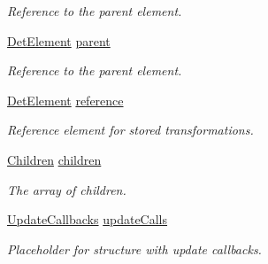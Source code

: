 \begin{DoxyCompactItemize}
\begin{DoxyCompactList}\small\item\em Reference to the parent element. \end{DoxyCompactList}\item 
\hyperlink{class_d_d4hep_1_1_geometry_1_1_det_element}{Det\+Element} \hyperlink{class_d_d4hep_1_1_geometry_1_1_det_element_object_a70ce8bf0603c0a7a4f6331faf71e66b6}{parent}
\begin{DoxyCompactList}\small\item\em Reference to the parent element. \end{DoxyCompactList}\item 
\hyperlink{class_d_d4hep_1_1_geometry_1_1_det_element}{Det\+Element} \hyperlink{class_d_d4hep_1_1_geometry_1_1_det_element_object_a6b87ce69ec6c292e36e87f5fed651278}{reference}
\begin{DoxyCompactList}\small\item\em Reference element for stored transformations. \end{DoxyCompactList}\item 
\hyperlink{class_d_d4hep_1_1_geometry_1_1_det_element_object_aaf04a1f51d7a7ce4c0e0dc4863268d8a}{Children} \hyperlink{class_d_d4hep_1_1_geometry_1_1_det_element_object_add8a182c8a2e611f0241bb752dfe9046}{children}
\begin{DoxyCompactList}\small\item\em The array of children. \end{DoxyCompactList}\item 
\hyperlink{class_d_d4hep_1_1_geometry_1_1_det_element_object_aa3bda3e351cc13f5bcce906a67d21872}{Update\+Callbacks} \hyperlink{class_d_d4hep_1_1_geometry_1_1_det_element_object_a95a0d42e4b0410c815ba45eceb2e76a3}{update\+Calls}
\begin{DoxyCompactList}\small\item\em Placeholder for structure with update callbacks. \end{DoxyCompactList}\end{DoxyCompactItemize}
{\bf }\par
